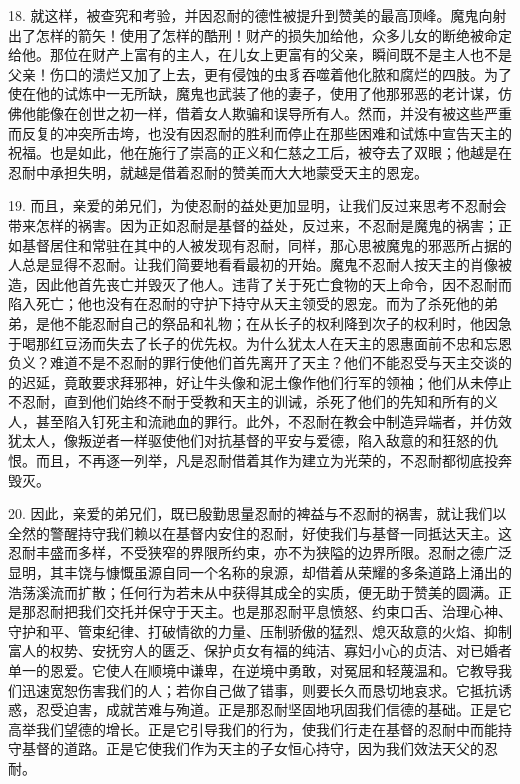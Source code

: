 18. 就这样，被查究和考验，并因忍耐的德性被提升到赞美的最高顶峰。魔鬼向射出了怎样的箭矢！使用了怎样的酷刑！财产的损失加给他，众多儿女的断绝被命定给他。那位在财产上富有的主人，在儿女上更富有的父亲，瞬间既不是主人也不是父亲！伤口的溃烂又加了上去，更有侵蚀的虫豸吞噬着他化脓和腐烂的四肢。为了使在他的试炼中一无所缺，魔鬼也武装了他的妻子，使用了他那邪恶的老计谋，仿佛他能像在创世之初一样，借着女人欺骗和误导所有人。然而，并没有被这些严重而反复的冲突所击垮，也没有因忍耐的胜利而停止在那些困难和试炼中宣告天主的祝福。也是如此，他在施行了崇高的正义和仁慈之工后，被夺去了双眼；他越是在忍耐中承担失明，就越是借着忍耐的赞美而大大地蒙受天主的恩宠。\par

19. 而且，亲爱的弟兄们，为使忍耐的益处更加显明，让我们反过来思考不忍耐会带来怎样的祸害。因为正如忍耐是基督的益处，反过来，不忍耐是魔鬼的祸害；正如基督居住和常驻在其中的人被发现有忍耐，同样，那心思被魔鬼的邪恶所占据的人总是显得不忍耐。让我们简要地看看最初的开始。魔鬼不忍耐人按天主的肖像被造，因此他首先丧亡并毁灭了他人。违背了关于死亡食物的天上命令，因不忍耐而陷入死亡；他也没有在忍耐的守护下持守从天主领受的恩宠。而为了杀死他的弟弟，是他不能忍耐自己的祭品和礼物；在从长子的权利降到次子的权利时，他因急于喝那红豆汤而失去了长子的优先权。为什么犹太人在天主的恩惠面前不忠和忘恩负义？难道不是不忍耐的罪行使他们首先离开了天主？他们不能忍受与天主交谈的的迟延，竟敢要求拜邪神，好让牛头像和泥土像作他们行军的领袖；他们从未停止不忍耐，直到他们始终不耐于受教和天主的训诫，杀死了他们的先知和所有的义人，甚至陷入钉死主和流祂血的罪行。此外，不忍耐在教会中制造异端者，并仿效犹太人，像叛逆者一样驱使他们对抗基督的平安与爱德，陷入敌意的和狂怒的仇恨。而且，不再逐一列举，凡是忍耐借着其作为建立为光荣的，不忍耐都彻底投奔毁灭。\par

20. 因此，亲爱的弟兄们，既已殷勤思量忍耐的裨益与不忍耐的祸害，就让我们以全然的警醒持守我们赖以在基督内安住的忍耐，好使我们与基督一同抵达天主。这忍耐丰盛而多样，不受狭窄的界限所约束，亦不为狭隘的边界所限。忍耐之德广泛显明，其丰饶与慷慨虽源自同一个名称的泉源，却借着从荣耀的多条道路上涌出的浩荡溪流而扩散；任何行为若未从中获得其成全的实质，便无助于赞美的圆满。正是那忍耐把我们交托并保守于天主。也是那忍耐平息愤怒、约束口舌、治理心神、守护和平、管束纪律、打破情欲的力量、压制骄傲的猛烈、熄灭敌意的火焰、抑制富人的权势、安抚穷人的匮乏、保护贞女有福的纯洁、寡妇小心的贞洁、对已婚者单一的恩爱。它使人在顺境中谦卑，在逆境中勇敢，对冤屈和轻蔑温和。它教导我们迅速宽恕伤害我们的人；若你自己做了错事，则要长久而恳切地哀求。它抵抗诱惑，忍受迫害，成就苦难与殉道。正是那忍耐坚固地巩固我们信德的基础。正是它高举我们望德的增长。正是它引导我们的行为，使我们行走在基督的忍耐中而能持守基督的道路。正是它使我们作为天主的子女恒心持守，因为我们效法天父的忍耐。\par


